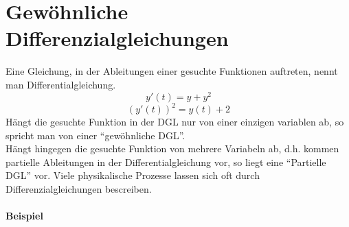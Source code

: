 \chapter{Gewöhnliche Differenzialgleichungen}
Eine Gleichung, in der Ableitungen einer gesuchte Funktionen auftreten, nennt man Differentialgleichung.
$$y'(t)=y+y^2$$
$$\left( y'(t)\right)^2=y(t)+2$$
Hängt die gesuchte Funktion in der DGL nur von einer einzigen variablen ab, so spricht man von einer ``gewöhnliche DGL''.\\

\noindent Hängt hingegen die gesuchte Funktion von mehrere Variabeln ab, d.h. kommen partielle Ableitungen in der Differentialgleichung vor, so liegt eine ``Partielle DGL'' vor. Viele physikalische Prozesse lassen sich oft durch Differenzialgleichungen bescreiben.
\subsubsection*{Beispiel}
